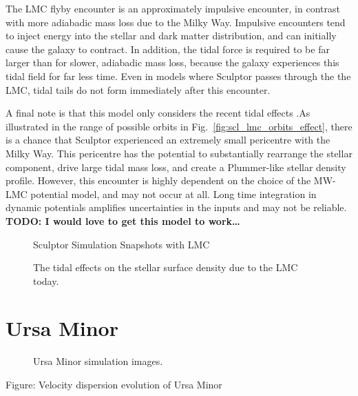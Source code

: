 The LMC flyby encounter is an approximately impulsive encounter, in
contrast with more adiabadic mass loss due to the Milky Way. Impulsive
encounters tend to inject energy into the stellar and dark matter
distribution, and can initially cause the galaxy to contract. In
addition, the tidal force is required to be far larger than for slower,
adiabadic mass loss, because the galaxy experiences this tidal field for
far less time. Even in models where Sculptor passes through the the LMC,
tidal tails do not form immediately after this encounter.

A final note is that this model only considers the recent tidal effects
.As illustrated in the range of possible orbits in
Fig.~\ref{fig:scl_lmc_orbits_effect}, there is a chance that Sculptor
experienced an extremely small pericentre with the Milky Way. This
pericentre has the potential to substantially rearrange the stellar
component, drive large tidal mass loss, and create a Plummer-like
stellar density profile. However, this encounter is highly dependent on
the choice of the MW-LMC potential model, and may not occur at all. Long
time integration in dynamic potentials amplifies uncertainties in the
inputs and may not be reliable. \textbf{TODO: I would love to get this
model to work\ldots{}}

\begin{figure}
\centering
{}
\caption{Sculptor Simulation Snapshots with
LMC}\label{fig:scl_lmc_sim_images}
\end{figure}

\begin{figure}
\centering
{}
\caption[Sculptor initial and final density with LMC]{The tidal effects
on the stellar surface density due to the LMC
today.}\label{fig:scl_lmc_i_f}
\end{figure}

\section{Ursa Minor}\label{ursa-minor}

\begin{figure}
\centering
{}
\caption[Ursa Minor simulation snapshots]{Ursa Minor simulation images.}
\end{figure}

Figure: Velocity dispersion evolution of Ursa Minor

